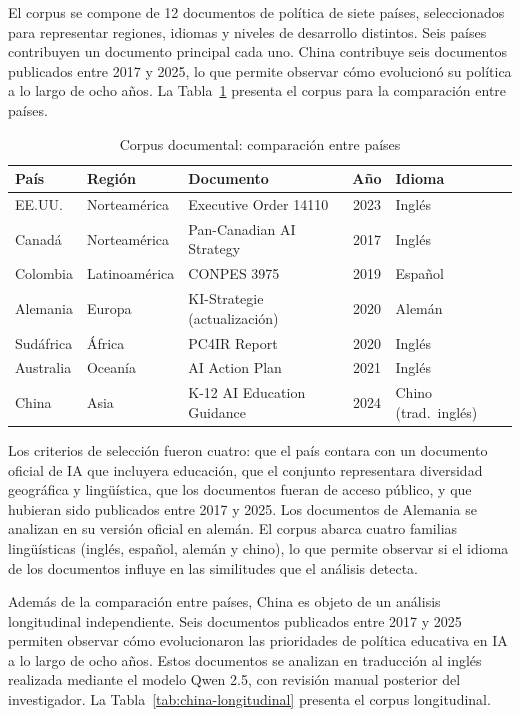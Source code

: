 El corpus se compone de 12 documentos de política de siete países, seleccionados para representar regiones, idiomas y niveles de desarrollo distintos. Seis países contribuyen un documento principal cada uno. China contribuye seis documentos publicados entre 2017 y 2025, lo que permite observar cómo evolucionó su política a lo largo de ocho años. La Tabla~\ref{tab:corpus-shorter} presenta el corpus para la comparación entre países.

\begin{table}[htbp]
\centering
\caption{Corpus documental: comparación entre países}
\label{tab:corpus-shorter}
\small
\begin{tabular}{p{2.2cm}p{2.5cm}p{5.5cm}cp{2cm}}
\hline
\textbf{País} & \textbf{Región} & \textbf{Documento} & \textbf{Año} & \textbf{Idioma} \\
\hline
EE.UU. & Norteamérica & Executive Order 14110 & 2023 & Inglés \\
Canadá & Norteamérica & Pan-Canadian AI Strategy & 2017 & Inglés \\
Colombia & Latinoamérica & CONPES 3975 & 2019 & Español \\
Alemania & Europa & KI-Strategie (actualización) & 2020 & Alemán \\
Sudáfrica & África & PC4IR Report & 2020 & Inglés \\
Australia & Oceanía & AI Action Plan & 2021 & Inglés \\
China & Asia & K-12 AI Education Guidance & 2024 & Chino (trad.\ inglés) \\
\hline
\end{tabular}
\end{table}

Los criterios de selección fueron cuatro: que el país contara con un documento oficial de IA que incluyera educación, que el conjunto representara diversidad geográfica y lingüística, que los documentos fueran de acceso público, y que hubieran sido publicados entre 2017 y 2025. Los documentos de Alemania se analizan en su versión oficial en alemán. El corpus abarca cuatro familias lingüísticas (inglés, español, alemán y chino), lo que permite observar si el idioma de los documentos influye en las similitudes que el análisis detecta.

Además de la comparación entre países, China es objeto de un análisis longitudinal independiente. Seis documentos publicados entre 2017 y 2025 permiten observar cómo evolucionaron las prioridades de política educativa en IA a lo largo de ocho años. Estos documentos se analizan en traducción al inglés realizada mediante el modelo Qwen 2.5, con revisión manual posterior del investigador. La Tabla~\ref{tab:china-longitudinal} presenta el corpus longitudinal.

